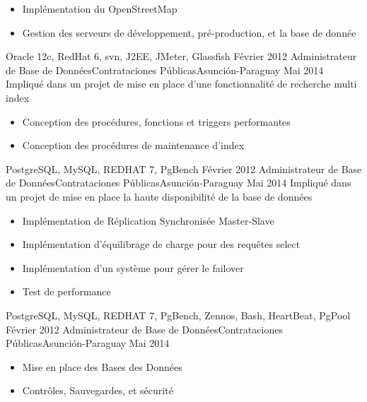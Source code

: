 \begin{experiences}
{\begin{itemize}
                        \item Implémentation du OpenStreetMap
                        \item Gestion des serveurs de développement, pré-production, et la base de donnée
                      \end{itemize}
				         }
                 {Oracle 12c, RedHat 6, svn, J2EE, JMeter, Glassfish}
  \emptySeparator
  \projectexperiences
    {Février 2012}   {Administrateur de Base de Données}{Contrataciones Públicas}{Asunción-Paraguay}
    {Mai 2014}      {
                      Impliqué dans un projet de mise en place d'une fonctionnalité de recherche multi index
                    }
                    {
                      \begin{itemize}
                        \item Conception des procédures, fonctions et triggers performantes
                        \item Conception des procédures de maintenance d'index
                      \end{itemize}
                    }
                {PostgreSQL, MySQL, REDHAT 7, PgBench}
  \emptySeparator
  \projectexperiences
    {Février 2012}   {Administrateur de Base de Données}{Contrataciones Públicas}{Asunción-Paraguay}
    {Mai 2014}      {
                      Impliqué dans un projet de mise en place la haute disponibilité de la base de données
                    }
                    {
                      \begin{itemize}
                        \item Implémentation de Réplication Synchronisée Master-Slave
                        \item Implémentation d'équilibrage de charge pour des requêtes select
                        \item Implémentation d'un système pour gérer le failover
                        \item  Test de performance
                      \end{itemize}
                    }
                {PostgreSQL, MySQL, REDHAT 7, PgBench, Zennos, Bash, HeartBeat, PgPool}
  \emptySeparator
  \experience
    {Février 2012}   {Administrateur de Base de Données}{Contrataciones Públicas}{Asunción-Paraguay}
    {Mai 2014} {
                      \begin{itemize}
                        \item Mise en place des Bases des Données
                        \item Contrôles, Sauvegardes, et sécurité

\end{itemize}}
\end{experiences}
